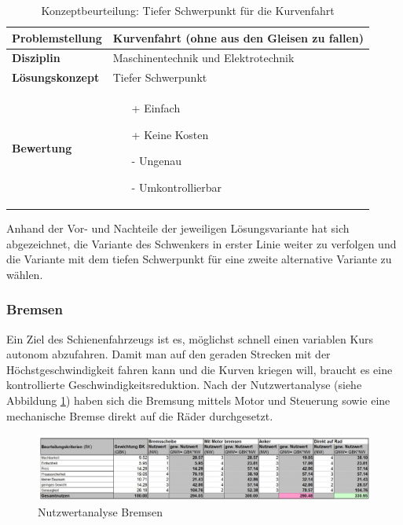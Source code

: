 \documentclass[../../main.tex]{subfiles}
\begin{document}
    \begin{flushleft}
        \begin{table}[h]
        \begin{tabular}{ | l | p{11cm} |}
        \hline
        \textbf{Problemstellung} & Kurvenfahrt (ohne aus den Gleisen zu fallen) \\ \hline
        \textbf{Disziplin} & Maschinentechnik und Elektrotechnik \\ \hline
        \textbf{Lösungskonzept} & Tiefer Schwerpunkt \\ \hline
        \textbf{Bewertung} &  \begin{itemize}
                                \item[+] Einfach
                                \item[+] Keine Kosten
                                \item[-] Ungenau 
                                \item[-] Umkontrollierbar 
                              \end{itemize} \\ \hline
        \end{tabular}
        \caption{Konzeptbeurteilung: Tiefer Schwerpunkt für die Kurvenfahrt}
        \label{tab:konzept_fahrwerk_tieferschwerpunkt}
    \end{table}
    \end{flushleft}

    Anhand der Vor- und Nachteile der jeweiligen Lösungsvariante hat sich abgezeichnet, die Variante des Schwenkers in erster Linie weiter zu verfolgen und die Variante mit dem tiefen Schwerpunkt für eine zweite alternative Variante zu wählen.
    
    \subsubsection{Bremsen}
    Ein Ziel des Schienenfahrzeugs ist es, möglichst schnell einen variablen Kurs autonom abzufahren. Damit man auf den geraden Strecken mit der Höchstgeschwindigkeit fahren kann und die Kurven kriegen will, braucht es eine kontrollierte Geschwindigkeitsreduktion. Nach der Nutzwertanalyse (siehe Abbildung \ref{fig:Bremsen}) haben sich die Bremsung mittels Motor und Steuerung sowie eine mechanische Bremse direkt auf die Räder durchgesetzt.

    \begin{figure}[H] %
        \centering
        \includegraphics[width=1\textwidth]{Bremsen}
        \caption{Nutzwertanalyse Bremsen}
        \label{fig:Bremsen}
    \end{figure}
\end{document}
